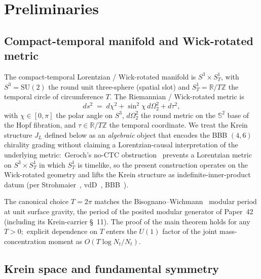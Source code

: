 \documentclass[11pt,a4paper]{article}
\theoremstyle{plain}
\theoremstyle{definition}
\newcommand{\Nt}{N_{t}}
\newcommand{\sthree}{S^{3}}
\newcommand{\SoneT}{S^{1}_{T}}
\newcommand{\Manifold}{S^{3}\times S^{1}_{T}}
\newcommand{\R}{\mathbb{R}}
\newcommand{\Z}{\mathbb{Z}}
\newcommand{\SU}{\mathrm{SU}}
\newcommand{\Uone}{U(1)}
\newcommand{\JL}{J_{L}}
\begin{document}
\section{Preliminaries}\label{sec:preliminaries}

\subsection{Compact-temporal manifold and Wick-rotated metric}
\label{sec:manifold}

The compact-temporal Lorentzian / Wick-rotated manifold is
$\Manifold$, with $\sthree = \SU(2)$ the round unit three-sphere
(spatial slot) and $\SoneT = \R / T\Z$ the temporal circle of
circumference $T$. The Riemannian / Wick-rotated metric is
\begin{equation}\label{eq:wick_metric}
   ds^{2} \;=\; d\chi^{2} + \sin^{2}\chi\, d\Omega_{2}^{2} + d\tau^{2},
\end{equation}
with $\chi \in [0, \pi]$ the polar angle on $\sthree$, $d\Omega_{2}^{2}$
the round metric on the $\mathbb{S}^{2}$ base of the Hopf fibration,
and $\tau \in \R/T\Z$ the temporal coordinate. We treat the Krein
structure $\JL$ defined below as an \emph{algebraic} object that
encodes the BBB $(4, 6)$ chirality grading without claiming a
Lorentzian-causal interpretation of the underlying metric:\ Geroch's
no-CTC obstruction~\cite{geroch1967} prevents a Lorentzian metric on
$\Manifold$ in which $\SoneT$ is timelike, so the present construction
operates on the Wick-rotated geometry and lifts the Krein structure as
indefinite-inner-product datum (per Strohmaier~\cite{strohmaier2006},
vdD~\cite{vandungen2016}, BBB~\cite{bizi_brouder_besnard2018}).

The canonical choice $T = 2\pi$ matches the
Bisognano--Wichmann~\cite{bisognano_wichmann1976} modular period at
unit surface gravity, the period of the posited modular generator of
Paper~42~\cite{paper42} (including its Krein-carrier \S~11). The proof of the main theorem
holds for any $T > 0$;\ explicit dependence on $T$ enters the
$\Uone$ factor of the joint mass-concentration moment as $O(T\log\Nt/\Nt)$.

\subsection{Krein space and fundamental symmetry}\label{sec:krein_space}
\end{document}
